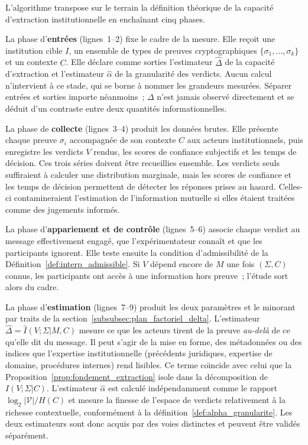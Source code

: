 \begin{sloppypar}
L'algorithme transpose sur le terrain la d\'efinition th\'eorique de la
capacit\'e d'extraction institutionnelle en encha\^inant cinq phases.

La phase d'\textbf{entr\'ees} (lignes~1--2) fixe le cadre de la mesure.
Elle re\c{c}oit une institution cible $I$, un ensemble de types de preuves
cryptographiques $\{\sigma_1, \ldots, \sigma_k\}$ et un contexte $C$. Elle
d\'eclare comme sorties l'estimateur $\hat\Delta$ de la capacit\'e
d'extraction et l'estimateur $\hat\alpha$ de la granularit\'e des verdicts.
Aucun calcul n'intervient \`a ce stade, qui se borne \`a nommer les grandeurs
mesur\'ees. S\'eparer entr\'ees et sorties importe n\'eanmoins~; $\Delta$
n'est jamais observ\'e directement et se d\'eduit d'un contraste entre
deux quantit\'es informationnelles.

La phase de \textbf{collecte} (lignes~3--4) produit les donn\'ees brutes.
Elle pr\'esente chaque preuve $\sigma_i$ accompagn\'ee de son contexte $C$
aux acteurs institutionnels, puis enregistre les verdicts $V$ rendus, les
scores de confiance subjectifs et les temps de d\'ecision. Ces trois s\'eries
doivent \^etre recueillies ensemble. Les verdicts seuls
suffiraient \`a calculer une distribution marginale, mais les scores de
confiance et les temps de d\'ecision permettent de d\'etecter les r\'eponses
prises au hasard. Celles-ci contamineraient l'estimation de l'information
mutuelle si elles \'etaient trait\'ees comme des jugements inform\'es.

La phase d'\textbf{appariement et de contr\^ole} (lignes~5--6) associe
chaque verdict au message effectivement engag\'e, que l'exp\'erimentateur
conna\^it et que les participants ignorent. Elle teste ensuite la condition
d'admissibilit\'e de la D\'efinition~\ref{def:interp_admissible}. Si $V$
d\'epend encore de $M$ une fois $(\Sigma,C)$ connus, les participants ont
acc\`es \`a une information hors preuve~; l'\'etude sort alors du cadre.

La phase d'\textbf{estimation} (lignes~7--9) produit les deux param\`etres et le minorant par traits de la section~\ref{subsubsec:plan_factoriel_delta}.
L'estimateur $\hat\Delta = \hat I(V;\Sigma|M,C)$ mesure ce que les acteurs
tirent de la preuve \emph{au-del\`a} de ce qu'elle dit du message. Il peut s'agir
de la mise en forme, des m\'etadonn\'ees ou des indices que l'expertise institutionnelle
(pr\'ec\'edents juridiques, expertise de domaine, proc\'edures internes) rend
lisibles. Ce terme co\"{\i}ncide avec celui que la
Proposition~\ref{prop:fondement_extraction} isole dans la d\'ecomposition de
$I(V;\Sigma|C)$. L'estimateur $\hat\alpha$ est
calcul\'e ind\'ependamment comme le rapport
$\log_2|\mathcal{V}| / H(C)$ et mesure la finesse de l'espace de verdicts
relativement \`a la richesse contextuelle, conform\'ement \`a la
d\'efinition~\ref{def:alpha_granularite}. Les deux estimateurs sont donc
acquis par des voies distinctes et peuvent \^etre valid\'es
s\'epar\'ement.


\end{sloppypar}
